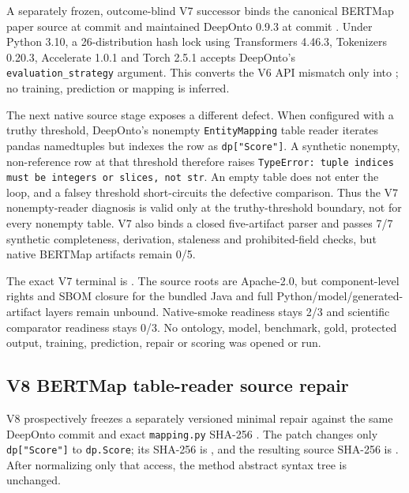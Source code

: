 A separately frozen, outcome-blind V7 successor binds the canonical BERTMap
paper source at commit 
and maintained DeepOnto 0.9.3 at commit
.  Under Python 3.10, a
26-distribution hash lock using Transformers 4.46.3, Tokenizers 0.20.3,
Accelerate 1.0.1 and Torch 2.5.1 accepts DeepOnto's
\texttt{evaluation\_strategy} argument.  This converts the V6 API mismatch
only into ; no training, prediction or
mapping is inferred.

The next native source stage exposes a different defect.  When configured with
a truthy threshold, DeepOnto's nonempty \texttt{EntityMapping} table reader
iterates pandas namedtuples but indexes the row as \texttt{dp["Score"]}. A
synthetic nonempty, non-reference row at that threshold therefore raises
\texttt{TypeError: tuple indices must be integers or slices, not str}.  An
empty table does not enter the loop, and a falsey threshold short-circuits the
defective comparison. Thus the V7 nonempty-reader diagnosis is valid only at
the truthy-threshold boundary, not for every nonempty table. V7 also binds a
closed five-artifact parser and passes 7/7 synthetic completeness, derivation,
staleness and prohibited-field checks, but native BERTMap artifacts remain 0/5.

The exact V7 terminal is
.
The source roots are Apache-2.0, but component-level rights and SBOM closure for
the bundled Java and full Python/model/generated-artifact layers remain
unbound. Native-smoke readiness stays 2/3 and scientific comparator readiness
stays 0/3. No ontology, model, benchmark, gold, protected output, training,
prediction, repair or scoring was opened or run.

\subsection{V8 BERTMap table-reader source repair}

V8 prospectively freezes a separately versioned minimal repair against the
same DeepOnto commit and exact \texttt{mapping.py} SHA-256
.
The patch changes only \texttt{dp["Score"]} to \texttt{dp.Score}; its SHA-256
is ,
and the resulting source SHA-256 is
.
After normalizing only that access, the method abstract syntax tree is
unchanged.

